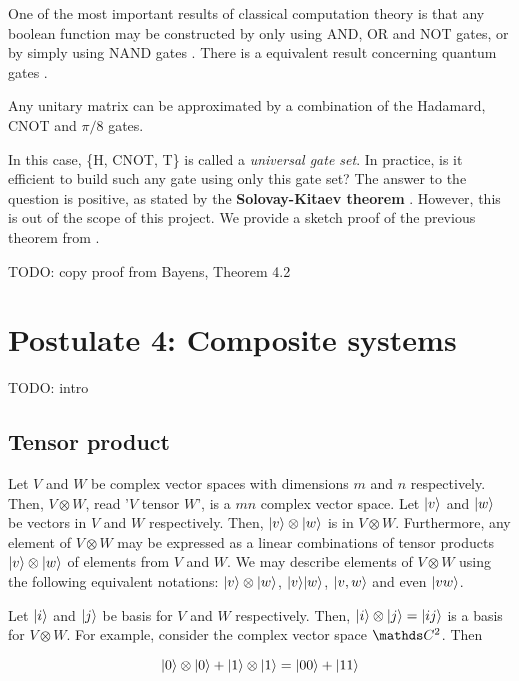 One of the most important results of classical computation theory is that any boolean function may be constructed by only using AND, OR and NOT gates, or by simply using NAND gates \cite{Lau2006}. There is a equivalent result concerning quantum gates \cite{Bayens2020}.

\begin{theorem}
	Any unitary matrix can be approximated by a combination of the Hadamard, CNOT and $\pi/8$ gates.
\end{theorem}

In this case, \{H, CNOT, T\} is called a \emph{universal gate set}. In practice, is it efficient to build such any gate using only this gate set? The answer to the question is positive, as stated by the \textbf{Solovay-Kitaev theorem} \cite{Dawson2006}. However, this is out of the scope of this project. We provide a sketch proof of the previous theorem from \cite{Bayens2020}.

\begin{proofs}
	TODO: copy proof from Bayens, Theorem 4.2
\end{proofs}


\section{Postulate 4: Composite systems}


TODO: intro


\subsection{Tensor product}


Let $V$ and $W$ be complex vector spaces with dimensions $m$ and $n$ respectively. Then, $V \otimes W$, read '$V$ tensor $W$', is a $mn$ complex vector space. Let $|v\rangle$ and $|w\rangle$ be vectors in $V$ and $W$ respectively. Then, $|v\rangle \otimes |w\rangle$ is in $V \otimes W$. Furthermore, any element of $V \otimes W$ may be expressed as a linear combinations of tensor products $|v\rangle \otimes |w\rangle$ of elements from $V$ and $W$. We may describe elements of $V \otimes W$ using the following equivalent notations: $|v\rangle \otimes |w\rangle$, $|v\rangle|w\rangle$, $|v, w\rangle$ and even $|vw\rangle$.

Let $|i\rangle$ and $|j\rangle$ be basis for $V$ and $W$ respectively. Then, $|i\rangle \otimes |j\rangle = |ij\rangle$ is a basis for $V \otimes W$. For example, consider the complex vector space $\C^2$. Then

$$ |0\rangle \otimes |0\rangle + |1\rangle \otimes |1\rangle = |00\rangle + |11\rangle $$

